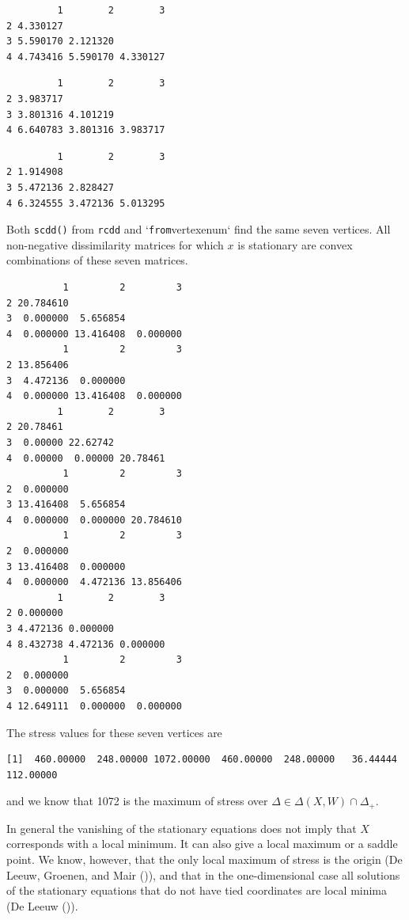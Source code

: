 \documentclass[
  12pt,
  letterpaper,
  DIV=11,
  numbers=noendperiod]{scrreprt}
\theoremstyle{remark}
\begin{document}
\begin{verbatim}
         1        2        3
2 4.330127                  
3 5.590170 2.121320         
4 4.743416 5.590170 4.330127
\end{verbatim}

\begin{verbatim}
         1        2        3
2 3.983717                  
3 3.801316 4.101219         
4 6.640783 3.801316 3.983717
\end{verbatim}

\begin{verbatim}
         1        2        3
2 1.914908                  
3 5.472136 2.828427         
4 6.324555 3.472136 5.013295
\end{verbatim}

Both \texttt{scdd()} from \texttt{rcdd} and `\texttt{from}vertexenum`
find the same seven vertices. All non-negative dissimilarity matrices
for which \(x\) is stationary are convex combinations of these seven
matrices.

\begin{verbatim}
          1         2         3
2 20.784610                    
3  0.000000  5.656854          
4  0.000000 13.416408  0.000000
          1         2         3
2 13.856406                    
3  4.472136  0.000000          
4  0.000000 13.416408  0.000000
         1        2        3
2 20.78461                  
3  0.00000 22.62742         
4  0.00000  0.00000 20.78461
          1         2         3
2  0.000000                    
3 13.416408  5.656854          
4  0.000000  0.000000 20.784610
          1         2         3
2  0.000000                    
3 13.416408  0.000000          
4  0.000000  4.472136 13.856406
         1        2        3
2 0.000000                  
3 4.472136 0.000000         
4 8.432738 4.472136 0.000000
          1         2         3
2  0.000000                    
3  0.000000  5.656854          
4 12.649111  0.000000  0.000000
\end{verbatim}

The stress values for these seven vertices are

\begin{verbatim}
[1]  460.00000  248.00000 1072.00000  460.00000  248.00000   36.44444  112.00000
\end{verbatim}

and we know that 1072 is the maximum of stress over
\(\Delta\in\Delta(X,W)\cap\Delta_+\).

In general the vanishing of the stationary equations does not imply that
\(X\) corresponds with a local minimum. It can also give a local maximum
or a saddle point. We know, however, that the only local maximum of
stress is the origin (De Leeuw, Groenen, and Mair
()), and that in the
one-dimensional case all solutions of the stationary equations that do
not have tied coordinates are local minima (De Leeuw
()).
\end{document}
